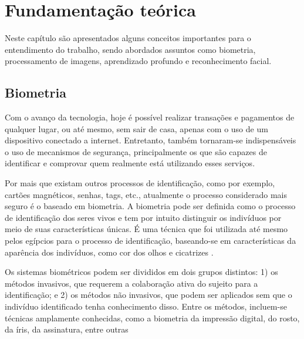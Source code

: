 \chapter{Fundamentação te\'orica}\label{cap:referencialTeorico}

Neste capítulo são apresentados alguns conceitos importantes para o entendimento
do trabalho, sendo abordados assuntos como biometria, processamento de imagens, aprendizado 
profundo e reconhecimento facial.

\section{Biometria}\label{sec:biometria}

Com o avanço da tecnologia, hoje é possível realizar transações e pagamentos 
de qualquer lugar, ou até mesmo, sem sair de casa, apenas com o uso de 
um dispositivo conectado a internet. Entretanto, também tornaram-se indispensáveis 
o uso de mecanismos de segurança, principalmente os que são capazes de identificar 
e comprovar quem realmente está utilizando esses serviços.

Por mais que existam outros processos de identificação, como por exemplo, cartões 
magnéticos, senhas, tags, etc., atualmente o processo considerado mais seguro é 
o baseado em biometria. A biometria pode ser definida como o processo de identificação 
dos seres vivos e tem por intuito distinguir os indivíduos por meio 
de suas características únicas. É uma técnica que foi utilizada até mesmo pelos egípcios 
para o processo de identificação, baseando-se em características da
aparência dos indivíduos, como cor dos olhos e cicatrizes \cite[p. 15]{galimberti2018}.

Os sistemas biométricos podem ser divididos em dois grupos distintos: 
1) os métodos invasivos, que requerem a colaboração ativa do sujeito 
para a identificação; e 2) os métodos não invasivos, que podem ser 
aplicados sem que o indivíduo identificado tenha conhecimento disso. 
Entre os métodos, incluem-se técnicas amplamente conhecidas, 
como a biometria da impressão digital, do rosto, da íris, da assinatura, 
entre outras \cite[p. 20]{teixeira2011}

